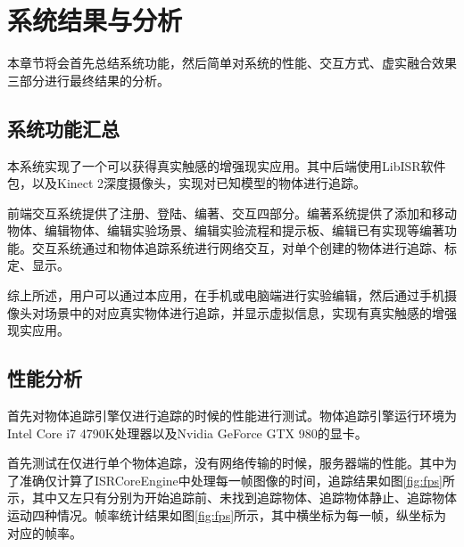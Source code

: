 \chapter{系统结果与分析}
\label{result}

本章节将会首先总结系统功能，然后简单对系统的性能、交互方式、虚实融合效果三部分进行最终结果的分析。

\section{系统功能汇总}
本系统实现了一个可以获得真实触感的增强现实应用。其中后端使用LibISR软件包，以及Kinect 2深度摄像头，实现对已知模型的物体进行追踪。

前端交互系统提供了注册、登陆、编著、交互四部分。编著系统提供了添加和移动物体、编辑物体、编辑实验场景、编辑实验流程和提示板、编辑已有实现等编著功能。交互系统通过和物体追踪系统进行网络交互，对单个创建的物体进行追踪、标定、显示。

综上所述，用户可以通过本应用，在手机或电脑端进行实验编辑，然后通过手机摄像头对场景中的对应真实物体进行追踪，并显示虚拟信息，实现有真实触感的增强现实应用。

\section{性能分析}

首先对物体追踪引擎仅进行追踪的时候的性能进行测试。物体追踪引擎运行环境为Intel Core i7 4790K处理器以及Nvidia GeForce GTX 980的显卡。

首先测试在仅进行单个物体追踪，没有网络传输的时候，服务器端的性能。其中为了准确仅计算了ISRCoreEngine中处理每一帧图像的时间，追踪结果如图\ref{fig:fps}所示，其中又左只有分别为开始追踪前、未找到追踪物体、追踪物体静止、追踪物体运动四种情况。帧率统计结果如图\ref{fig:fps}所示，其中横坐标为每一帧，纵坐标为对应的帧率。

